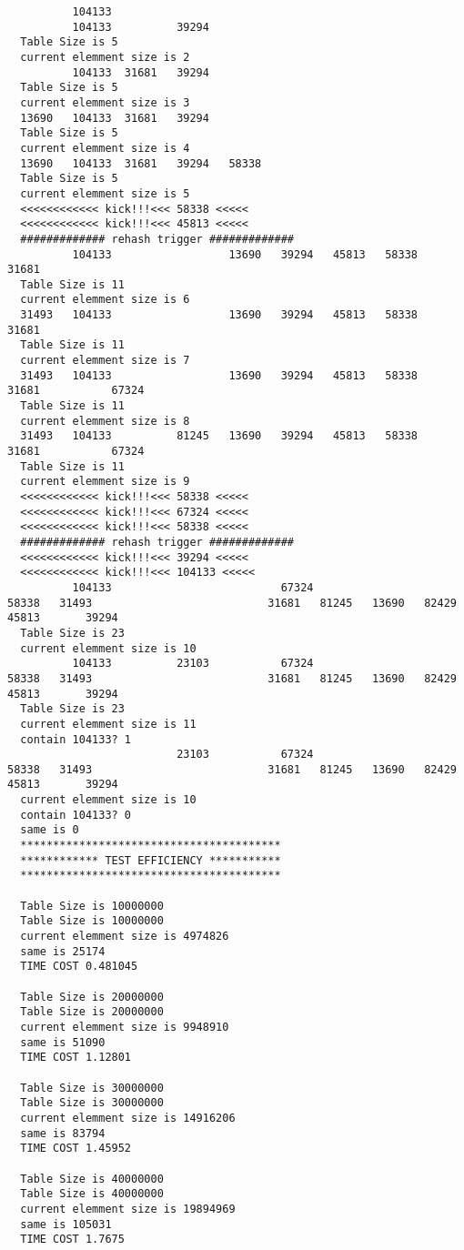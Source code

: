 \documentclass[UTF8]{ctexart}
\begin{document}
\begin{verbatim}
          104133
          104133          39294
  Table Size is 5
  current elemment size is 2
          104133  31681   39294
  Table Size is 5
  current elemment size is 3
  13690   104133  31681   39294
  Table Size is 5
  current elemment size is 4
  13690   104133  31681   39294   58338
  Table Size is 5
  current elemment size is 5
  <<<<<<<<<<<< kick!!!<<< 58338 <<<<<
  <<<<<<<<<<<< kick!!!<<< 45813 <<<<<
  ############# rehash trigger #############
          104133                  13690   39294   45813   58338   31681
  Table Size is 11
  current elemment size is 6
  31493   104133                  13690   39294   45813   58338   31681
  Table Size is 11
  current elemment size is 7
  31493   104133                  13690   39294   45813   58338   31681           67324
  Table Size is 11
  current elemment size is 8
  31493   104133          81245   13690   39294   45813   58338   31681           67324
  Table Size is 11
  current elemment size is 9
  <<<<<<<<<<<< kick!!!<<< 58338 <<<<<
  <<<<<<<<<<<< kick!!!<<< 67324 <<<<<
  <<<<<<<<<<<< kick!!!<<< 58338 <<<<<
  ############# rehash trigger #############
  <<<<<<<<<<<< kick!!!<<< 39294 <<<<<
  <<<<<<<<<<<< kick!!!<<< 104133 <<<<<
          104133                          67324                           58338   31493                           31681   81245   13690   82429   45813       39294
  Table Size is 23
  current elemment size is 10
          104133          23103           67324                           58338   31493                           31681   81245   13690   82429   45813       39294
  Table Size is 23
  current elemment size is 11
  contain 104133? 1
                          23103           67324                           58338   31493                           31681   81245   13690   82429   45813       39294
  current elemment size is 10
  contain 104133? 0
  same is 0
  ****************************************
  ************ TEST EFFICIENCY ***********
  ****************************************

  Table Size is 10000000
  Table Size is 10000000
  current elemment size is 4974826
  same is 25174
  TIME COST 0.481045

  Table Size is 20000000
  Table Size is 20000000
  current elemment size is 9948910
  same is 51090
  TIME COST 1.12801

  Table Size is 30000000
  Table Size is 30000000
  current elemment size is 14916206
  same is 83794
  TIME COST 1.45952

  Table Size is 40000000
  Table Size is 40000000
  current elemment size is 19894969
  same is 105031
  TIME COST 1.7675


\end{verbatim}
\end{document}
